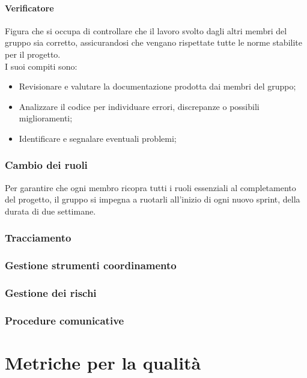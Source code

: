 \documentclass[10pt]{article}
\begin{document}
\begin{justify}
        \paragraph{Verificatore}
        Figura che si occupa di controllare che il lavoro svolto dagli altri membri del gruppo sia corretto, assicurandosi che vengano rispettate tutte le norme stabilite per il progetto.\\
        I suoi compiti sono:
        \begin{itemize}
            \item Revisionare e valutare la documentazione prodotta dai membri del gruppo;
            \item Analizzare il codice per individuare errori, discrepanze o possibili miglioramenti;
            \item Identificare e segnalare eventuali problemi;
        \end{itemize}

    \subsubsection{Cambio dei ruoli}
    Per garantire che ogni membro ricopra tutti i ruoli essenziali al completamento del progetto, il gruppo si impegna a ruotarli all'inizio di ogni nuovo sprint, della durata di due settimane.\\

    \subsubsection{Tracciamento}

    \subsubsection{Gestione strumenti coordinamento}

    \subsubsection{Gestione dei rischi}

    \subsubsection{Procedure comunicative}

\newpage
\section{Metriche per la qualità}

        
        

\end{justify}
\end{document}
